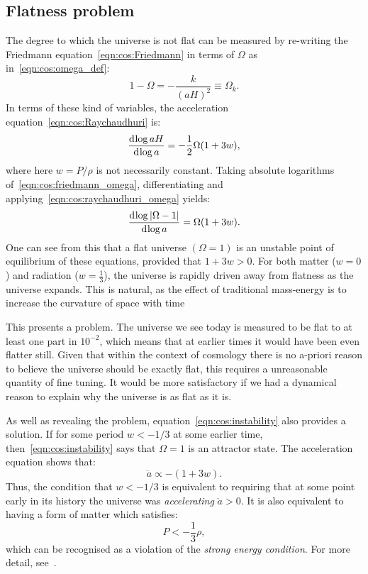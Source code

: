 \subsection{Flatness problem}
The degree to which the universe is not flat can be measured by re-writing the Friedmann equation~\eqref{eqn:cos:Friedmann} in terms of \(\Omega\) as in~\eqref{eqn:cos:omega_def}:
\begin{equation}
  1-\Omega = -\frac{k}{{(aH)}^2} \equiv \Omega_k.
  \label{eqn:cos:friedmann_omega}
\end{equation}
In terms of these kind of variables, the acceleration equation~\eqref{eqn:cos:Raychaudhuri} is:
\begin{equation}
  \frac{\operatorname{d}^{}\!{\log aH}}{\operatorname{d}^{}\!{\log a} } = -\frac{1}{2}\Omega(1+3w),
  \label{eqn:cos:raychaudhuri_omega}
\end{equation}
where here \(w=P/\rho\) is not necessarily constant.
Taking absolute logarithms of~\eqref{eqn:cos:friedmann_omega}, differentiating and applying~\eqref{eqn:cos:raychaudhuri_omega} yields:
\begin{equation}
  \frac{\operatorname{d}^{}\!{\log |\Omega-1|}}{\operatorname{d}^{}\!{\log a} } = \Omega(1+3w).
  \label{eqn:cos:instability}
\end{equation}
One can see from this that a flat universe \((\Omega=1)\) is an unstable point of equilibrium of these equations, provided that \(1+3w>0\). For both matter (\({w=0}\)) and radiation (\({w=\frac{1}{3}}\)), the universe is rapidly driven away from flatness as the universe expands. This is natural, as the effect of traditional mass-energy is to increase the curvature of space with time

This presents a problem. The universe we see today is measured to be flat to at least one part in \(10^{-2}\), which means that at earlier times it would have been even flatter still. Given that within the context of cosmology there is no a-priori reason to believe the universe should be exactly flat, this requires a unreasonable quantity of fine tuning. It would be more satisfactory if we had a dynamical reason to explain why the universe is as flat as it is.

As well as revealing the problem, equation~\eqref{eqn:cos:instability} also provides a solution. If for some period \(w<-1/3\) at some earlier time, then~\eqref{eqn:cos:instability} says that \(\Omega=1\) is an attractor state. The acceleration equation shows that:
\begin{equation}
  \ddot{a} \propto -(1+3w).
  \label{eqn:cos:Raychaudhuri_acc}
\end{equation}
Thus, the condition that \(w<-1/3\) is equivalent to requiring that at some point early in its history the universe was {\em accelerating\/} \(\ddot{a}>0\). It is also equivalent to having a form of matter which satisfies:
\begin{equation}
  P < -\frac{1}{3}\rho,
  \label{eqn:cos:SEC_violation}
\end{equation}
which can be recognised as a violation of the {\em strong energy condition}. For more detail, see~\cite{SEC_violation}.

